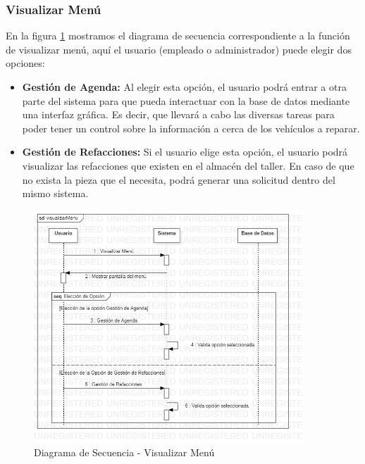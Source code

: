 \subsubsection{Visualizar Menú}
En la figura \ref{fig:Diagrama de Secuencia - Visualizar Menú} mostramos el diagrama de secuencia correspondiente a la función de visualizar menú, aquí el usuario (empleado o administrador) puede elegir dos opciones:
\begin{itemize}
	\item \textbf{Gestión de Agenda:} Al elegir esta opción, el usuario podrá entrar a otra parte del sistema para que pueda interactuar con la base de datos mediante una interfaz gráfica. Es decir, que llevará a cabo las diversas tareas para poder tener un control sobre la información a cerca de los vehículos a reparar.
	\item \textbf{Gestión de Refacciones:} Si el usuario elige esta opción, el usuario podrá visualizar las refacciones que existen en el almacén del taller. En caso de que no exista la pieza que el necesita, podrá generar una solicitud dentro del mismo sistema. 
\end{itemize}
\begin{figure}[!h]
	\centering
	\includegraphics[width=0.9\textwidth]{./diseno/vprocesos/imagenes/visualizarMenu}
	\caption{Diagrama de Secuencia - Visualizar Menú}
	\label{fig:Diagrama de Secuencia - Visualizar Menú}
\end{figure}